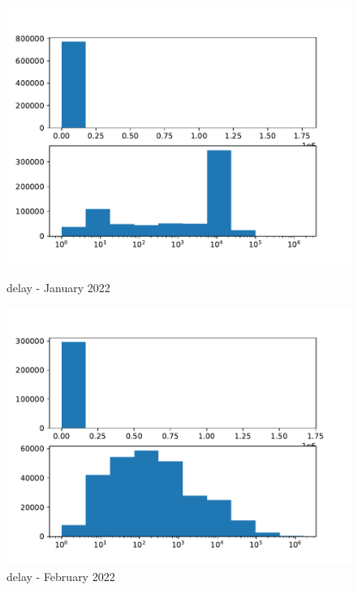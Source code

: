 \documentclass[a4paper]{article}
\begin{document}
\begin{figure}[H] 
  \begin{minipage}[b]{0.5\linewidth}
    \centering
    \includegraphics[width=1.11\linewidth]{MBSS/plot/Distribution/2022_01_delay.pdf} 
    \caption{delay - January 2022} 
    \vspace{4ex}
  \end{minipage}%
  \begin{minipage}[b]{0.5\linewidth}
    \centering
    \includegraphics[width=1.11\linewidth]{MBSS/plot/Distribution/2022_02_delay.pdf} 
    \caption{delay - February 2022} 
    \vspace{4ex}
  \end{minipage} 
  \begin{minipage}[b]{0.5\linewidth}

\end{minipage}
\end{figure}
\end{document}
